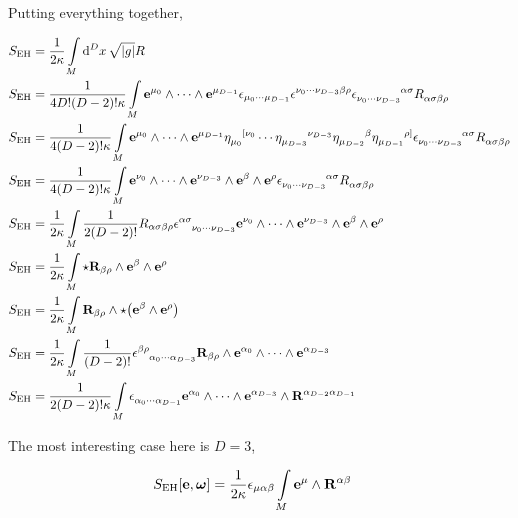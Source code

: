 Putting everything together,

\begin{align*}
    S_{\textnormal{EH}}&=\frac{1}{2\kappa}\int\limits_M\dd[D]{x}\sqrt{\abs{g}}R\\
    S_{\textnormal{EH}}&=\frac{1}{4D!\qty(D-2)!\kappa}\int\limits_M\vb e^{\mu_0}\wedge\cdots\wedge\vb e^{\mu_{D-1}}\epsilon_{\mu_0\cdots\mu_{D-1}}\tensor{\epsilon}{^{\nu_0}^\cdots^{\nu_{D-3}}^\beta^\rho}\tensor{\epsilon}{_{\nu_0}_\cdots_{\nu_{D-3}}^\alpha^\sigma}\tensor{R}{_\alpha_\sigma_\beta_\rho}\\
    S_{\textnormal{EH}}&=\frac{1}{4\qty(D-2)!\kappa}\int\limits_M\vb e^{\mu_0}\wedge\cdots\wedge\vb e^{\mu_{D-1}}\tensor{\eta}{_{\mu_0}^{[\nu_0}}\cdots\tensor{\eta}{_{\mu_{D-3}}^{\nu_{D-3}}}\tensor{\eta}{_{\mu_{D-2}}^{\beta}}\tensor{\eta}{_{\mu_{D-1}}^{\rho]}}\tensor{\epsilon}{_{\nu_0}_\cdots_{\nu_{D-3}}^\alpha^\sigma}\tensor{R}{_\alpha_\sigma_\beta_\rho}\\
    S_{\textnormal{EH}}&=\frac{1}{4\qty(D-2)!\kappa}\int\limits_M\vb e^{\nu_0}\wedge\cdots\wedge\vb e^{\nu_{D-3}}\wedge\vb e^{\beta}\wedge\vb e^{\rho}\tensor{\epsilon}{_{\nu_0}_\cdots_{\nu_{D-3}}^\alpha^\sigma}\tensor{R}{_\alpha_\sigma_\beta_\rho}\\
    S_{\textnormal{EH}}&=\frac{1}{2\kappa}\int\limits_M\frac{1}{2\qty(D-2)!}R_{\alpha\sigma\beta\rho}\tensor{\epsilon}{^\alpha^\sigma_{\nu_0}_\cdots_{\nu_{D-3}}}\vb e^{\nu_0}\wedge\cdots\wedge\vb e^{\nu_{D-3}}\wedge\vb e^{\beta}\wedge\vb e^{\rho}\\
    S_{\textnormal{EH}}&=\frac{1}{2\kappa}\int\limits_M\star\vb R_{\beta\rho}\wedge\vb e^{\beta}\wedge\vb e^{\rho}\\
    S_{\textnormal{EH}}&=\frac{1}{2\kappa}\int\limits_M\vb R_{\beta\rho}\wedge\star\qty(\vb e^{\beta}\wedge\vb e^{\rho})\\
    S_{\textnormal{EH}}&=\frac{1}{2\kappa}\int\limits_M\frac{1}{\qty(D-2)!}\tensor{\epsilon}{^\beta^\rho_{\alpha_0}_\cdots_{\alpha_{D-3}}}\vb R_{\beta\rho}\wedge\vb e^{\alpha_0}\wedge\cdots\wedge\vb e^{\alpha_{D-3}}\\
    S_{\textnormal{EH}}&=\frac{1}{2\qty(D-2)!\kappa}\int\limits_M\tensor{\epsilon}{_{\alpha_0}_\cdots_{\alpha_{D-1}}}\vb e^{\alpha_0}\wedge\cdots\wedge\vb e^{\alpha_{D-3}}\wedge\vb R^{\alpha_{D-2}\alpha_{D-1}}
\end{align*}

The most interesting case here is $D=3$,

\begin{align*}
    S_{\textnormal{EH}}\qty[\vb e,\boldsymbol\omega]&=\frac{1}{2\kappa}\epsilon_{\mu\alpha\beta}\int\limits_M\vb e^{\mu}\wedge\vb R^{\alpha\beta}
\end{align*}


